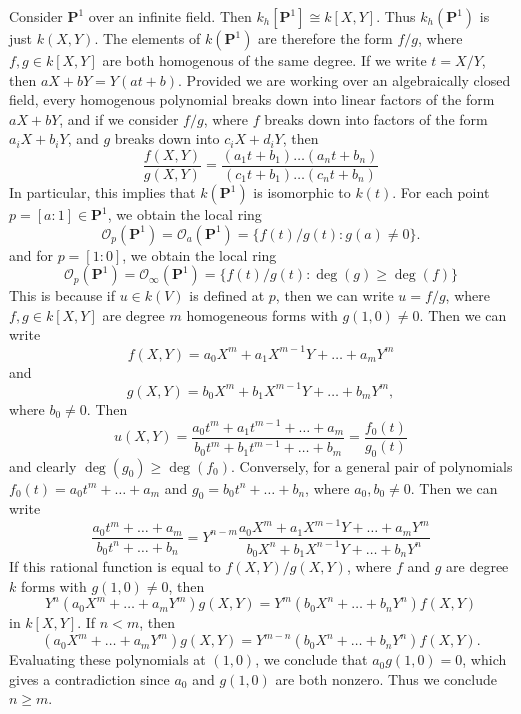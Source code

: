 \begin{example}
    Consider $\mathbf{P}^1$ over an infinite field. Then $k_h[\mathbf{P}^1] \cong k[X,Y]$. Thus $k_h(\mathbf{P}^1)$ is just $k(X,Y)$. The elements of $k(\mathbf{P}^1)$ are therefore the form $f/g$, where $f,g \in k[X,Y]$ are both homogenous of the same degree. If we write $t = X/Y$, then $aX + bY = Y(at + b)$. Provided we are working over an algebraically closed field, every homogenous polynomial breaks down into linear factors of the form $aX + bY$, and if we consider $f/g$, where $f$ breaks down into factors of the form $a_iX + b_iY$, and $g$ breaks down into $c_iX + d_iY$, then
    \[ \frac{f(X,Y)}{g(X,Y)} = \frac{(a_1t + b_1) \dots (a_nt + b_n)}{(c_1t + b_1) \dots (c_nt + b_n)} \]
    In particular, this implies that $k(\mathbf{P}^1)$ is isomorphic to $k(t)$. For each point $p = [a:1] \in \mathbf{P}^1$, we obtain the local ring
    \[ \mathcal{O}_p(\mathbf{P}^1) = \mathcal{O}_a(\mathbf{P}^1) = \{ f(t)/g(t) : g(a) \neq 0 \}. \]
    and for $p = [1:0]$, we obtain the local ring
    \[ \mathcal{O}_p(\mathbf{P}^1) = \mathcal{O}_\infty(\mathbf{P}^1) = \{  f(t)/g(t) : \deg(g) \geq \deg(f) \} \]
    This is because if $u \in k(V)$ is defined at $p$, then we can write $u = f/g$, where $f,g \in k[X,Y]$ are degree $m$ homogeneous forms with $g(1,0) \neq 0$. Then we can write
    \[ f(X,Y) = a_0X^m + a_1X^{m-1}Y + \dots + a_m Y^m \]
    and
    \[ g(X,Y) = b_0X^m + b_1X^{m-1}Y + \dots + b_m Y^m, \]
    where $b_0 \neq 0$. Then
    \[ u(X,Y) = \frac{a_0 t^m + a_1 t^{m-1} + \dots + a_m}{b_0 t^m + b_1 t^{m-1} + \dots + b_m} = \frac{f_0(t)}{g_0(t)} \]
    and clearly $\deg(g_0) \geq \deg(f_0)$. Conversely, for a general pair of polynomials $f_0(t) = a_0 t^m + \dots + a_m$ and $g_0 = b_0 t^n + \dots + b_n$, where $a_0,b_0 \neq 0$. Then we can write
    \[ \frac{a_0 t^m + \dots + a_m}{b_0 t^n + \dots + b_n} = Y^{n-m} \frac{a_0 X^m + a_1 X^{m-1}Y + \dots + a_m Y^m}{b_0 X^n + b_1 X^{n-1} Y + \dots + b_n Y^n} \]
    If this rational function is equal to $f(X,Y)/g(X,Y)$, where $f$ and $g$ are degree $k$ forms with $g(1,0) \neq 0$, then
    \[ Y^n (a_0 X^m + \dots + a_m Y^m) g(X,Y) = Y^m (b_0 X^n + \dots + b_n Y^n) f(X,Y) \]
    in $k[X,Y]$. If $n < m$, then
    \[ (a_0 X^m + \dots + a_m Y^m) g(X,Y) = Y^{m-n} (b_0 X^n + \dots + b_n Y^n) f(X,Y). \]
    Evaluating these polynomials at $(1,0)$, we conclude that $a_0 g(1,0) = 0$, which gives a contradiction since $a_0$ and $g(1,0)$ are both nonzero. Thus we conclude $n \geq m$.


\end{example}
